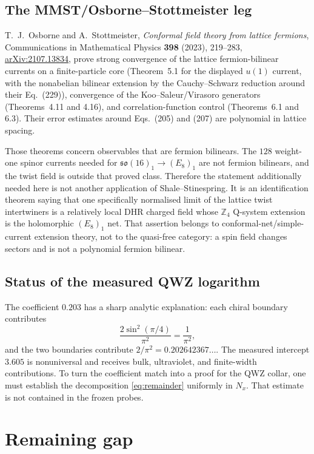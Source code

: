 \subsection{The MMST/Osborne--Stottmeister leg}

T.~J.~Osborne and A.~Stottmeister,
\emph{Conformal field theory from lattice fermions},
Communications in Mathematical Physics \textbf{398} (2023), 219--283,
\href{https://arxiv.org/abs/2107.13834}{arXiv:2107.13834},
prove strong convergence of the lattice fermion-bilinear currents on a
finite-particle core (Theorem~5.1 for the displayed $u(1)$ current, with
the nonabelian bilinear extension by the Cauchy--Schwarz reduction around
their Eq.~(229)), convergence of the Koo--Saleur/Virasoro generators
(Theorems~4.11 and 4.16), and correlation-function control
(Theorems~6.1 and 6.3).  Their error estimates around Eqs.~(205) and
(207) are polynomial in lattice spacing.

Those theorems concern observables that are fermion bilinears.  The
$128$ weight-one spinor currents needed for
$\mathfrak{so}(16)_1\to(E_8)_1$ are not fermion bilinears, and the twist
field is outside that proved class.  Therefore the statement additionally
needed here is not another application of Shale--Stinespring.  It is an
identification theorem saying that one specifically normalised limit of
the lattice twist intertwiners is a relatively local DHR charged field
whose $\mathbb Z_4$ Q-system extension is the holomorphic $(E_8)_1$ net.
That assertion belongs to conformal-net/simple-current extension theory,
not to the quasi-free category: a spin field changes sectors and is not a
polynomial fermion bilinear.

\subsection{Status of the measured QWZ logarithm}

The coefficient $0.203$ has a sharp analytic explanation:
each chiral boundary contributes
\[
\frac{2\sin^2(\pi/4)}{\pi^2}=\frac1{\pi^2},
\]
and the two boundaries contribute $2/\pi^2=0.202642367\ldots$.
The measured intercept $3.605$ is nonuniversal and receives bulk,
ultraviolet, and finite-width contributions.  To turn the coefficient
match into a proof for the QWZ collar, one must establish the decomposition
\eqref{eq:remainder} uniformly in $N_x$.  That estimate is not contained
in the frozen probes.

\section{Remaining gap}

